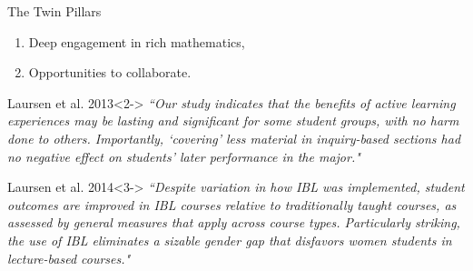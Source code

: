 \documentclass[10pt,handout]{beamer}
\begin{document}
\begin{frame}

\begin{block}{The Twin Pillars}
\begin{enumerate}
\item Deep engagement in rich mathematics,
\item Opportunities to collaborate.
\end{enumerate}
\end{block}

\begin{block}{Laursen et al. 2013}<2->
\emph{``Our study indicates that the benefits of active learning experiences may be lasting and significant for some student groups, with no harm done to others. Importantly, ‘covering’ less material in inquiry-based sections had no negative effect on students' later performance in the major."}
\end{block}

\begin{block}{Laursen et al. 2014}<3->
\emph{``Despite variation in how IBL was implemented, student outcomes are improved in IBL courses relative to traditionally taught courses, as assessed by general measures that apply across course types. Particularly striking, the use of IBL eliminates a sizable gender gap that disfavors women students in lecture-based courses."}
\end{block}

\end{frame}

\end{document}
